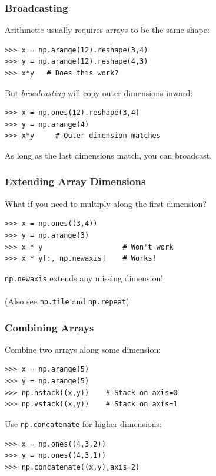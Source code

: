 \documentclass[red]{beamer}
\begin{document}
\begin{frame}[fragile]
    \frametitle{Broadcasting}

    Arithmetic usually requires arrays to be the same shape:
    \begin{lstlisting}
>>> x = np.arange(12).reshape(3,4)
>>> y = np.arange(12).reshape(4,3)
>>> x*y   # Does this work?
    \end{lstlisting}

    But \textit{broadcasting} will copy outer dimensions inward:
    \begin{lstlisting}
>>> x = np.ones(12).reshape(3,4)
>>> y = np.arange(4)
>>> x*y     # Outer dimension matches
    \end{lstlisting}
    As long as the last dimensions match, you can broadcast.
\end{frame}
\begin{frame}[fragile]
    \frametitle{Extending Array Dimensions}

    What if you need to multiply along the first dimension?
    \begin{lstlisting}
>>> x = np.ones((3,4))
>>> y = np.arange(3)
>>> x * y                   # Won't work
>>> x * y[:, np.newaxis]    # Works!
    \end{lstlisting}
    \lstinline|np.newaxis| extends any missing dimension!
    \\~\\
    (Also see \lstinline|np.tile| and \lstinline|np.repeat|)
\end{frame}
\begin{frame}[fragile]
    \frametitle{Combining Arrays}

    Combine two arrays along some dimension:
    \begin{lstlisting}
>>> x = np.arange(5)
>>> y = np.arange(5)
>>> np.hstack((x,y))    # Stack on axis=0
>>> np.vstack((x,y))    # Stack on axis=1
    \end{lstlisting}

    Use \lstinline|np.concatenate| for higher dimensions:
    \begin{lstlisting}
>>> x = np.ones((4,3,2))
>>> y = np.ones((4,3,1))
>>> np.concatenate((x,y),axis=2)
    \end{lstlisting}
\end{frame}
\end{document}
